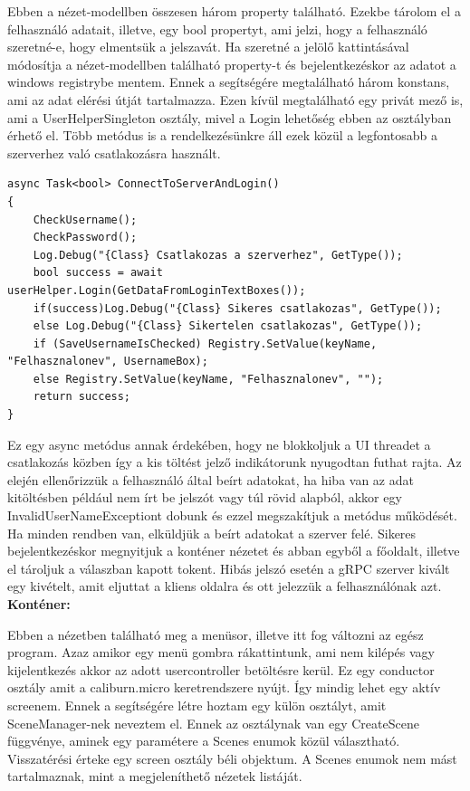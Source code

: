 \documentclass[
]{thesis-ekf}
\theoremstyle{definition}
\theoremstyle{remark}
\begin{document}
Ebben a nézet-modellben összesen három property található. Ezekbe tárolom el a felhasználó adatait, illetve, egy bool propertyt, ami jelzi, hogy a felhasználó szeretné-e, hogy elmentsük a jelszavát. Ha szeretné a jelölő kattintásával módosítja a nézet-modellben található property-t és bejelentkezéskor az adatot a windows registrybe mentem. Ennek a segítségére megtalálható három konstans, ami az adat elérési útját tartalmazza. Ezen kívül megtalálható egy privát mező is, ami a UserHelperSingleton osztály, mivel a Login lehetőség ebben az osztályban érhető el. Több metódus is a rendelkezésünkre áll ezek közül a legfontosabb a szerverhez való csatlakozásra használt.

\begin{lstlisting}[caption={Bejelentkezés},captionpos=b]
async Task<bool> ConnectToServerAndLogin()
{
	CheckUsername();
	CheckPassword();
	Log.Debug("{Class} Csatlakozas a szerverhez", GetType());
	bool success = await userHelper.Login(GetDataFromLoginTextBoxes());
	if(success)Log.Debug("{Class} Sikeres csatlakozas", GetType());
	else Log.Debug("{Class} Sikertelen csatlakozas", GetType());
	if (SaveUsernameIsChecked) Registry.SetValue(keyName, "Felhasznalonev", UsernameBox);
	else Registry.SetValue(keyName, "Felhasznalonev", "");
	return success;
}
\end{lstlisting}
Ez egy async metódus annak érdekében, hogy ne blokkoljuk a UI threadet a csatlakozás közben így a kis töltést jelző indikátorunk nyugodtan futhat rajta. Az elején ellenőrizzük a felhasználó által beírt adatokat, ha hiba van az adat kitöltésben például nem írt be jelszót vagy túl rövid alapból, akkor egy InvalidUserNameExceptiont dobunk és ezzel megszakítjuk a metódus működését. Ha minden rendben van, elküldjük a beírt adatokat a szerver felé. Sikeres bejelentkezéskor megnyitjuk a konténer nézetet és abban egyből a főoldalt, illetve el tároljuk a válaszban kapott tokent. Hibás jelszó esetén a gRPC szerver kivált egy kivételt, amit eljuttat a kliens oldalra és ott jelezzük a felhasználónak azt.\\
\textbf{Konténer:}

Ebben a nézetben található meg a menüsor, illetve itt fog változni az egész program. Azaz amikor egy menü gombra rákattintunk, ami nem kilépés vagy kijelentkezés akkor az adott usercontroller betöltésre kerül. Ez egy conductor osztály amit a caliburn.micro keretrendszere nyújt. Így mindig lehet egy aktív screenem. Ennek a segítségére létre hoztam egy külön osztályt, amit SceneManager-nek neveztem el. Ennek az osztálynak van egy CreateScene függvénye, aminek egy paramétere a Scenes enumok közül választható. Visszatérési érteke egy screen osztály béli objektum. A Scenes enumok nem mást tartalmaznak, mint a megjeleníthető nézetek listáját. 
\end{document}
